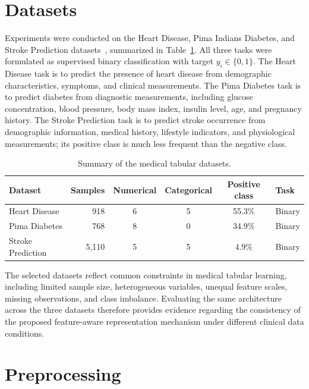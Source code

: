 \documentclass[11pt,a4paper,oneside, openany, reqno, chapter, nokorean]{oblivoir}
\theoremstyle{definition}
\theoremstyle{remark}
\numberwithin{equation}{chapter}
\theoremstyle{definition}
\theoremstyle{remark}
\theoremstyle{definition}
\begin{document}
\section{Datasets}
\label{sec:datasets}

Experiments were conducted on the Heart Disease, Pima Indians Diabetes, 
and Stroke Prediction datasets~\cite{heartdataset,pimadataset,strokedataset}, summarized in
Table~\ref{tab:datasets}. All three tasks were formulated as supervised binary
classification with target $y_i\in\{0,1\}$. The Heart Disease task is to
predict the presence of heart disease from demographic characteristics,
symptoms, and clinical measurements. The Pima Diabetes task is to predict
diabetes from diagnostic measurements, including glucose concentration, blood
pressure, body mass index, insulin level, age, and pregnancy history. The
Stroke Prediction task is to predict stroke occurrence from demographic
information, medical history, lifestyle indicators, and physiological
measurements; its positive class is much less frequent than the negative class.



\begin{table}[t]
\caption{Summary of the medical tabular datasets.}
\label{tab:datasets}
\centering
\small
\begin{tabular}{lrcccl}
\toprule
Dataset & Samples & Numerical & Categorical & Positive class & Task \\
\midrule
Heart Disease     &   918 & 6 & 5 & 55.3\% & Binary \\
Pima Diabetes     &   768 & 8 & 0 & 34.9\% & Binary \\
Stroke Prediction & 5,110 & 5 & 5 &  4.9\% & Binary \\
\bottomrule
\end{tabular}
\end{table}

The selected datasets reflect common constraints in medical tabular learning, including limited sample size, heterogeneous variables, unequal feature scales, missing observations, and class imbalance. Evaluating the same architecture across the three datasets therefore provides evidence regarding the consistency of the proposed feature-aware representation mechanism under different clinical data conditions.

\section{Preprocessing}
\label{sec:preprocessing}
\end{document}
